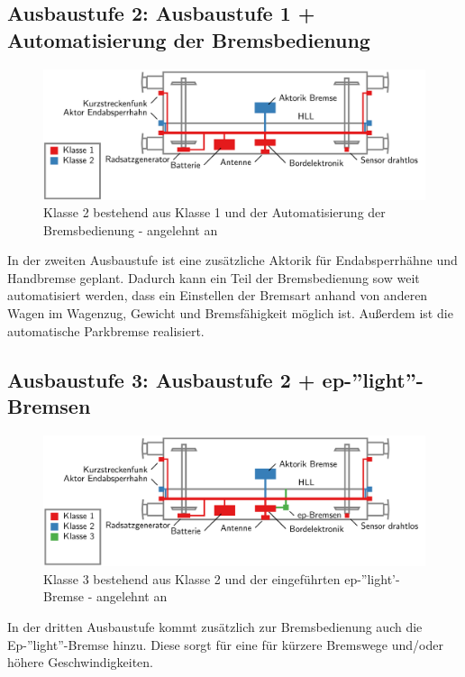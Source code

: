 \subsection{Ausbaustufe 2: Ausbaustufe 1 + Automatisierung der Bremsbedienung}
\begin{figure}[htbp] 
    \includegraphics[width=\textwidth]{Bilder/Ausbaustufen_2.PNG}
    \caption{Klasse 2 bestehend aus Klasse 1 und der Automatisierung der Bremsbedienung - angelehnt an \cite{ETR_3}}
    \label{fig:Klasse2}
\end{figure} 
In der zweiten Ausbaustufe ist eine zusätzliche Aktorik für Endabsperrhähne und Handbremse geplant. Dadurch kann ein Teil der Bremsbedienung sow weit automatisiert werden, dass ein Einstellen der Bremsart anhand von anderen Wagen im Wagenzug, Gewicht und Bremsfähigkeit möglich ist. Außerdem ist die automatische Parkbremse realisiert.\par
\subsection{Ausbaustufe 3: Ausbaustufe 2 + ep-''light''-Bremsen}
\begin{figure}[htbp] 
    \includegraphics[width=\textwidth]{Bilder/Ausbaustufen_3.PNG}
    \caption{Klasse 3 bestehend aus Klasse 2 und der eingeführten ep-''light'-Bremse - angelehnt an \cite{ETR_3}}
    \label{fig:Klasse3}
\end{figure} 
In der dritten Ausbaustufe kommt zusätzlich zur Bremsbedienung auch die Ep-''light''-Bremse hinzu. Diese sorgt für eine für kürzere Bremswege und/oder höhere Geschwindigkeiten.\par
